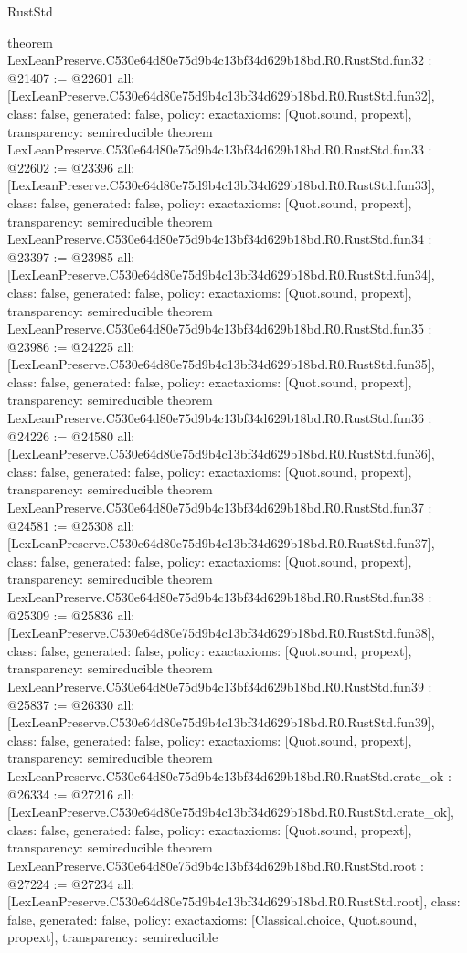 \begin{lexlean}{RustStd}
\begin{coremodule}
{}
theorem LexLeanPreserve.C530e64d80e75d9b4c13bf34d629b18bd.R0.RustStd.fun32 : @21407 := @22601 {
  all: [LexLeanPreserve.C530e64d80e75d9b4c13bf34d629b18bd.R0.RustStd.fun32],
  class: false,
  generated: false,
  policy: exact{axioms: [Quot.sound, propext]},
  transparency: semireducible
}
theorem LexLeanPreserve.C530e64d80e75d9b4c13bf34d629b18bd.R0.RustStd.fun33 : @22602 := @23396 {
  all: [LexLeanPreserve.C530e64d80e75d9b4c13bf34d629b18bd.R0.RustStd.fun33],
  class: false,
  generated: false,
  policy: exact{axioms: [Quot.sound, propext]},
  transparency: semireducible
}
theorem LexLeanPreserve.C530e64d80e75d9b4c13bf34d629b18bd.R0.RustStd.fun34 : @23397 := @23985 {
  all: [LexLeanPreserve.C530e64d80e75d9b4c13bf34d629b18bd.R0.RustStd.fun34],
  class: false,
  generated: false,
  policy: exact{axioms: [Quot.sound, propext]},
  transparency: semireducible
}
theorem LexLeanPreserve.C530e64d80e75d9b4c13bf34d629b18bd.R0.RustStd.fun35 : @23986 := @24225 {
  all: [LexLeanPreserve.C530e64d80e75d9b4c13bf34d629b18bd.R0.RustStd.fun35],
  class: false,
  generated: false,
  policy: exact{axioms: [Quot.sound, propext]},
  transparency: semireducible
}
theorem LexLeanPreserve.C530e64d80e75d9b4c13bf34d629b18bd.R0.RustStd.fun36 : @24226 := @24580 {
  all: [LexLeanPreserve.C530e64d80e75d9b4c13bf34d629b18bd.R0.RustStd.fun36],
  class: false,
  generated: false,
  policy: exact{axioms: [Quot.sound, propext]},
  transparency: semireducible
}
theorem LexLeanPreserve.C530e64d80e75d9b4c13bf34d629b18bd.R0.RustStd.fun37 : @24581 := @25308 {
  all: [LexLeanPreserve.C530e64d80e75d9b4c13bf34d629b18bd.R0.RustStd.fun37],
  class: false,
  generated: false,
  policy: exact{axioms: [Quot.sound, propext]},
  transparency: semireducible
}
theorem LexLeanPreserve.C530e64d80e75d9b4c13bf34d629b18bd.R0.RustStd.fun38 : @25309 := @25836 {
  all: [LexLeanPreserve.C530e64d80e75d9b4c13bf34d629b18bd.R0.RustStd.fun38],
  class: false,
  generated: false,
  policy: exact{axioms: [Quot.sound, propext]},
  transparency: semireducible
}
theorem LexLeanPreserve.C530e64d80e75d9b4c13bf34d629b18bd.R0.RustStd.fun39 : @25837 := @26330 {
  all: [LexLeanPreserve.C530e64d80e75d9b4c13bf34d629b18bd.R0.RustStd.fun39],
  class: false,
  generated: false,
  policy: exact{axioms: [Quot.sound, propext]},
  transparency: semireducible
}
theorem LexLeanPreserve.C530e64d80e75d9b4c13bf34d629b18bd.R0.RustStd.crate_ok : @26334 := @27216 {
  all: [LexLeanPreserve.C530e64d80e75d9b4c13bf34d629b18bd.R0.RustStd.crate_ok],
  class: false,
  generated: false,
  policy: exact{axioms: [Quot.sound, propext]},
  transparency: semireducible
}
theorem LexLeanPreserve.C530e64d80e75d9b4c13bf34d629b18bd.R0.RustStd.root : @27224 := @27234 {
  all: [LexLeanPreserve.C530e64d80e75d9b4c13bf34d629b18bd.R0.RustStd.root],
  class: false,
  generated: false,
  policy: exact{axioms: [Classical.choice, Quot.sound, propext]},
  transparency: semireducible
}


\end{coremodule}
\end{lexlean}
